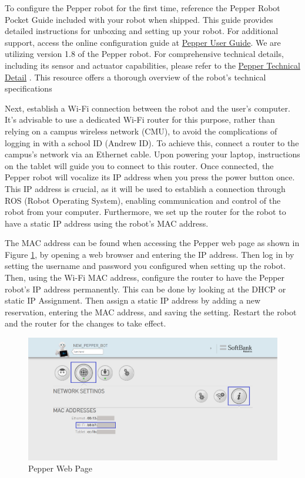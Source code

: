 \documentclass{CSSRforAfrica}
\begin{document}
{\label{setup_pepper}
To configure the Pepper robot for the first time, reference the Pepper Robot Pocket Guide included with your robot when shipped. This guide provides detailed instructions for unboxing and setting up your robot. For additional support, access the online configuration guide at \href{http://doc.aldebaran.com/2-5/family/pepper_user_guide/first_conf_pep.html}{Pepper User Guide}. We are utilizing version 1.8 of the Pepper robot. For comprehensive technical details, including its sensor and actuator capabilities, please refer to the 
\href{http://doc.aldebaran.com/2-5/family/pepper_technical/index_pep.html}{Pepper Technical Detail} \cite{SoftBankDocumentation}. This resource offers a thorough overview of the robot's technical specifications

Next, establish a Wi-Fi connection between the robot and the user's computer. It's advisable to use a dedicated Wi-Fi router for this purpose, rather than relying on a campus wireless network (CMU), to avoid the complications of logging in with a school ID (Andrew ID). To achieve this, connect a router to the campus's network via an Ethernet cable. Upon powering your laptop, instructions on the tablet will guide you to connect to this router. Once connected, the Pepper robot will vocalize its IP address when you press the power button once. This IP address is crucial, as it will be used to establish a connection through ROS (Robot Operating System), enabling communication and control of the robot from your computer. Furthermore, we set up the router for the robot to have a static IP address using the robot's MAC address. 

The MAC address can be found when accessing the Pepper web page as shown in Figure \ref{fig:pepper-web-page}, by opening a web browser and entering the IP address. Then log in by setting the username and password you configured when setting up the robot. Then, using the Wi-Fi MAC address, configure the router to have the Pepper robot's IP address permanently. This can be done by looking at the DHCP or static IP Assignment. Then assign a static IP address by adding a new reservation, entering the MAC  address, and saving the setting. Restart the robot and the router for the changes to take effect.

\begin{figure}[!hbpt]
\centering
\includegraphics[scale=0.30]{images/Pepper-Web-page.png}
\caption{Pepper Web Page}
\label{fig:pepper-web-page}
\end{figure}
}
\end{document}
